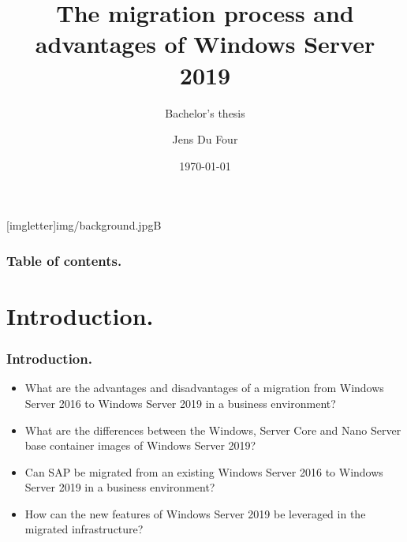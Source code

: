 \documentclass[aspectratio=169]{beamer}
\title{The migration process and advantages of Windows Server 2019}
\subtitle{Bachelor's thesis}
\author{Jens Du Four}
\date{\today}
\begin{document}
{
    [imgletter]{img/background.jpg}{B}  
    \begin{frame}
    \maketitle
    \end{frame}
}

\begin{frame}
  \frametitle{Table of contents.}
  \tableofcontents
\end{frame}
\section{Introduction.}
\begin{frame}
\frametitle{Introduction.}  
\vspace*{\fill}
    \begin{itemize}
    	\itemsep0.4em
        \item[] {What are the advantages and disadvantages of a migration from Windows Server 2016 to Windows Server 2019 in a business environment?}
        \item[] {What are the differences between the Windows, Server Core and Nano Server base container images of Windows Server 2019?}
        \item[] {Can SAP be migrated from an existing Windows Server 2016 to Windows Server 2019 in a business environment?}
        \item[] {How can the new features of Windows Server 2019 be leveraged in the migrated infrastructure?}
    \end{itemize}
\vspace*{\fill}

\end{frame}
\end{document}
